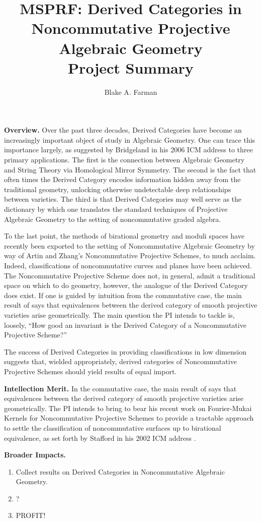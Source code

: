 \documentclass[11pt]{article}
\title{MSPRF: Derived Categories in Noncommutative Projective Algebraic Geometry\\\small{Project Summary}}
\author{Blake A. Farman}
\date{}
\begin{document}
\maketitle

\noindent\textbf{Overview.}
Over the past three decades, Derived Categories have become an increasingly important object of study in Algebraic Geometry.
One can trace this importance largely, as suggested by Bridgeland in his 2006 ICM address \cite{Bridgeland06} to three primary applications.
The first is the connection between Algebraic Geometry and String Theory via Homological Mirror Symmetry.
The second is the fact that often times the Derived Category encodes information hidden away from the traditional geometry, unlocking otherwise undetectable deep relationships between varieties.
The third is that Derived Categories may well serve as the dictionary by which one translates the standard techniques of Projective Algebraic Geometry to the setting of noncommutative graded algebra.

To the last point, the methods of birational geometry and moduli spaces have recently been exported to the setting of Noncommutative Algebraic Geometry by way of Artin and Zhang's Noncommutative Projective Schemes, to much acclaim.
Indeed, classifications of noncommutative curves and planes have been achieved.
The Noncommutative Projective Scheme does not, in general, admit a traditional space on which to do geometry, however, the analogue of the Derived Category does exist.
If one is guided by intuition from the commutative case, the main result of \cite{Orlov1997} says that equivalences between the derived category of smooth projective varieties arise geometrically.
The main question the PI intends to tackle is, loosely, ``How good an invariant is the Derived Category of a Noncommutative Projective Scheme?''

The success of Derived Categories in providing classifications in low dimension suggests that, wielded appropriately, derived categories of Noncommutative Projective Schemes should yield results of equal import.

\noindent\textbf{Intellection Merit.}
In the commutative case, the main result of \cite{Orlov1997} says that equivalences between the derived category of smooth projective varieties arise geometrically.
The PI intends to bring to bear his recent work on Fourier-Mukai Kernels for Noncommutative Projective Schemes to provide a tractable approach to settle the classification of noncommutative surfaces up to birational equivalence, as set forth by Stafford in his 2002 ICM address \cite{Stafford02}.

\noindent\textbf{Broader Impacts.}
\begin{enumerate}[Step 1.]
\item
  Collect results on Derived Categories in Noncommutative Algebraic Geometry.
\item
  ?
\item
  PROFIT!
\end{enumerate}
\newpage

\end{document}

